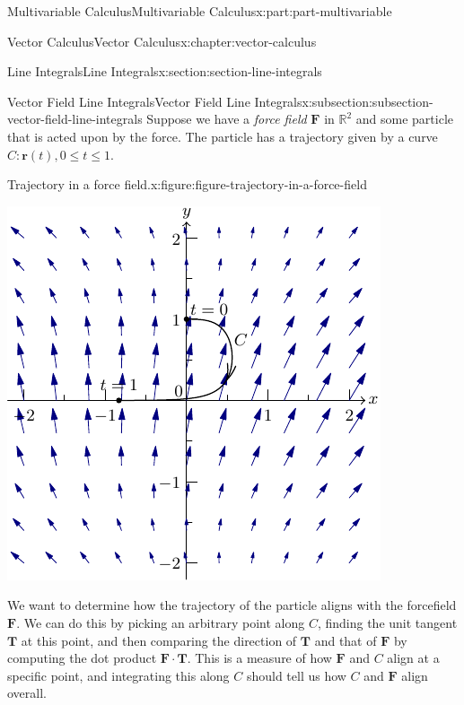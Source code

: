 \documentclass[twoside,10pt,]{tufte-book}
\numberwithin{equation}{part}
\newcommand{\RR}{\mathbb{R}}
\newcommand{\vb}[1]{\mathbf{#1}}
\begin{document}
\begin{partptx}{Multivariable Calculus}{}{Multivariable Calculus}{}{}{x:part:part-multivariable}
\begin{chapterptx}{Vector Calculus}{}{Vector Calculus}{}{}{x:chapter:vector-calculus}
\begin{sectionptx}{Line Integrals}{}{Line Integrals}{}{}{x:section:section-line-integrals}
%
%
\typeout{************************************************}
\typeout{************************************************}
%
\begin{subsectionptx}{Vector Field Line Integrals}{}{Vector Field Line Integrals}{}{}{x:subsection:subsection-vector-field-line-integrals}
Suppose we have a \emph{force field} \(\vb{F}\) in \(\RR^{2}\) and some particle that is acted upon by the force. The particle has a trajectory given by a curve \(C: \vb{r}(t), 0\leq t\leq 1\). \begin{figureptx}{Trajectory in a force field.}{x:figure:figure-trajectory-in-a-force-field}{}%
\begin{image}{0}{1}{0}%
\includegraphics[width=\linewidth]{generated/asymptote/image-trajectory-in-a-force-field.pdf}
\end{image}%
\tcblower
\end{figureptx}%
%
\par
We want to determine how the trajectory of the particle aligns with the forcefield \(\vb{F}\). We can do this by picking an arbitrary point along \(C\), finding the unit tangent \(\vb{T}\) at this point, and then comparing the direction of \(\vb{T}\) and that of \(\vb{F}\) by computing the dot product \(\vb{F}\cdot\vb{T}\). This is a measure of how \(\vb{F}\) and \(C\) align at a specific point, and integrating this along \(C\) should tell us how \(C\) and \(\vb{F}\) align overall.%

\end{subsectionptx}
\end{sectionptx}
\end{chapterptx}
\end{partptx}
\end{document}
